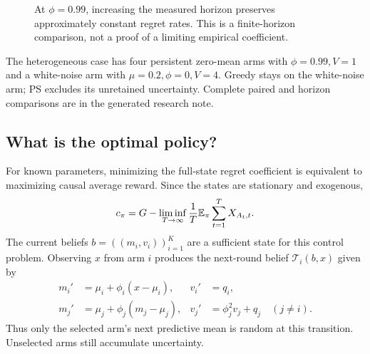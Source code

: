\begin{figure}[p]
\caption{At $\phi=0.99$, increasing the measured horizon preserves approximately constant regret rates. This is a finite-horizon comparison, not a proof of a limiting empirical coefficient.}
\end{figure}

The heterogeneous case has four persistent zero-mean arms with $\phi=0.99,V=1$ and a white-noise arm with $\mu=0.2,\phi=0,V=4$. Greedy stays on the white-noise arm; PS excludes its unretained uncertainty. Complete paired and horizon comparisons are in the generated research note.

\clearpage

\subsection{What is the optimal policy?}
\label{predictive_ar1:sec:optimal-control}
For known parameters, minimizing the full-state regret coefficient is equivalent to maximizing causal average reward. Since the states are stationary and exogenous,
\begin{equation}
c_\pi=G-\liminf_{T\to\infty}\frac1T\mathbb E_\pi\sum_{t=1}^TX_{A_t,t}.
\label{predictive_ar1:eq:gain-equivalence}
\end{equation}
The current beliefs $b=((m_i,v_i))_{i=1}^K$ are a sufficient state for this control problem. Observing $x$ from arm $i$ produces the next-round belief $\mathcal T_i(b,x)$ given by
\begin{align}
m_i'&=\mu_i+\phi_i(x-\mu_i), &v_i'&=q_i,\nonumber\\
m_j'&=\mu_j+\phi_j(m_j-\mu_j), &v_j'&=\phi_j^2v_j+q_j\quad(j\ne i).
\label{predictive_ar1:eq:belief-transition}
\end{align}
Thus only the selected arm's next predictive mean is random at this transition. Unselected arms still accumulate uncertainty.

